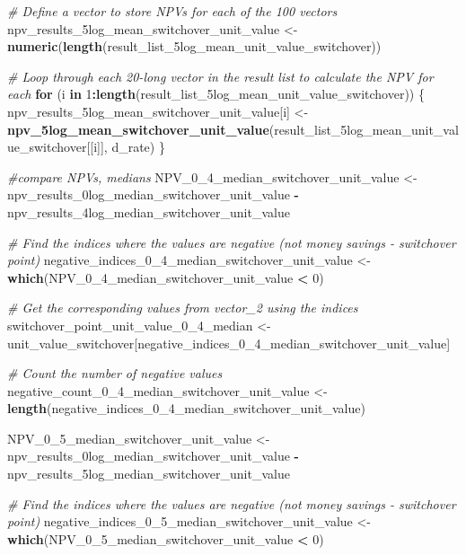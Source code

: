 \documentclass[
]{article}
\newenvironment{Shaded}{\begin{snugshade}}{\end{snugshade}}
\newcommand{\CommentTok}[1]{\textcolor[rgb]{0.56,0.35,0.01}{\textit{#1}}}
\newcommand{\ControlFlowTok}[1]{\textcolor[rgb]{0.13,0.29,0.53}{\textbf{#1}}}
\newcommand{\DecValTok}[1]{\textcolor[rgb]{0.00,0.00,0.81}{#1}}
\newcommand{\FunctionTok}[1]{\textcolor[rgb]{0.13,0.29,0.53}{\textbf{#1}}}
\newcommand{\NormalTok}[1]{#1}
\newcommand{\OtherTok}[1]{\textcolor[rgb]{0.56,0.35,0.01}{#1}}
\newcommand{\SpecialCharTok}[1]{\textcolor[rgb]{0.81,0.36,0.00}{\textbf{#1}}}
\begin{document}
\begin{Shaded}
\begin{Highlighting}[]
\CommentTok{\# Define a vector to store NPVs for each of the 100 vectors}
\NormalTok{npv\_results\_5log\_mean\_switchover\_unit\_value }\OtherTok{\textless{}{-}} \FunctionTok{numeric}\NormalTok{(}\FunctionTok{length}\NormalTok{(result\_list\_5log\_mean\_unit\_value\_switchover))}

\CommentTok{\# Loop through each 20{-}long vector in the result list to calculate the NPV for each}
\ControlFlowTok{for}\NormalTok{ (i }\ControlFlowTok{in} \DecValTok{1}\SpecialCharTok{:}\FunctionTok{length}\NormalTok{(result\_list\_5log\_mean\_unit\_value\_switchover)) \{}
\NormalTok{  npv\_results\_5log\_mean\_switchover\_unit\_value[i] }\OtherTok{\textless{}{-}} \FunctionTok{npv\_5log\_mean\_switchover\_unit\_value}\NormalTok{(result\_list\_5log\_mean\_unit\_value\_switchover[[i]], d\_rate)}
\NormalTok{\}}



\CommentTok{\#compare NPVs, medians}
\NormalTok{NPV\_0\_4\_median\_switchover\_unit\_value }\OtherTok{\textless{}{-}}\NormalTok{ npv\_results\_0log\_median\_switchover\_unit\_value }\SpecialCharTok{{-}}\NormalTok{ npv\_results\_4log\_median\_switchover\_unit\_value}

\CommentTok{\# Find the indices where the values are negative (not money savings {-} switchover point)}
\NormalTok{negative\_indices\_0\_4\_median\_switchover\_unit\_value }\OtherTok{\textless{}{-}} \FunctionTok{which}\NormalTok{(NPV\_0\_4\_median\_switchover\_unit\_value }\SpecialCharTok{\textless{}} \DecValTok{0}\NormalTok{)}

\CommentTok{\# Get the corresponding values from vector\_2 using the indices}
\NormalTok{switchover\_point\_unit\_value\_0\_4\_median }\OtherTok{\textless{}{-}}\NormalTok{ unit\_value\_switchover[negative\_indices\_0\_4\_median\_switchover\_unit\_value]}

\CommentTok{\# Count the number of negative values}
\NormalTok{negative\_count\_0\_4\_median\_switchover\_unit\_value }\OtherTok{\textless{}{-}} \FunctionTok{length}\NormalTok{(negative\_indices\_0\_4\_median\_switchover\_unit\_value)}


\NormalTok{NPV\_0\_5\_median\_switchover\_unit\_value }\OtherTok{\textless{}{-}}\NormalTok{ npv\_results\_0log\_median\_switchover\_unit\_value }\SpecialCharTok{{-}}\NormalTok{ npv\_results\_5log\_median\_switchover\_unit\_value}

\CommentTok{\# Find the indices where the values are negative (not money savings {-} switchover point)}
\NormalTok{negative\_indices\_0\_5\_median\_switchover\_unit\_value }\OtherTok{\textless{}{-}} \FunctionTok{which}\NormalTok{(NPV\_0\_5\_median\_switchover\_unit\_value }\SpecialCharTok{\textless{}} \DecValTok{0}\NormalTok{)}


\end{Highlighting}
\end{Shaded}
\end{document}
